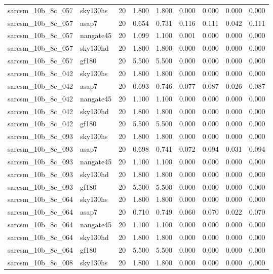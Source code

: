 \begin{tabular}{llrrrrrrr}
sarcsm\_10b\_8c\_057 & sky130hs & 20 & 1.800 & 1.800 & 0.000 & 0.000 & 0.000 & 0.000 \\
sarcsm\_10b\_8c\_057 & asap7 & 20 & 0.654 & 0.731 & 0.116 & 0.111 & 0.042 & 0.111 \\
sarcsm\_10b\_8c\_057 & nangate45 & 20 & 1.099 & 1.100 & 0.001 & 0.000 & 0.000 & 0.000 \\
sarcsm\_10b\_8c\_057 & sky130hd & 20 & 1.800 & 1.800 & 0.000 & 0.000 & 0.000 & 0.000 \\
sarcsm\_10b\_8c\_057 & gf180 & 20 & 5.500 & 5.500 & 0.000 & 0.000 & 0.000 & 0.000 \\
sarcsm\_10b\_8c\_042 & sky130hs & 20 & 1.800 & 1.800 & 0.000 & 0.000 & 0.000 & 0.000 \\
sarcsm\_10b\_8c\_042 & asap7 & 20 & 0.693 & 0.746 & 0.077 & 0.087 & 0.026 & 0.087 \\
sarcsm\_10b\_8c\_042 & nangate45 & 20 & 1.100 & 1.100 & 0.000 & 0.000 & 0.000 & 0.000 \\
sarcsm\_10b\_8c\_042 & sky130hd & 20 & 1.800 & 1.800 & 0.000 & 0.000 & 0.000 & 0.000 \\
sarcsm\_10b\_8c\_042 & gf180 & 20 & 5.500 & 5.500 & 0.000 & 0.000 & 0.000 & 0.000 \\
sarcsm\_10b\_8c\_093 & sky130hs & 20 & 1.800 & 1.800 & 0.000 & 0.000 & 0.000 & 0.000 \\
sarcsm\_10b\_8c\_093 & asap7 & 20 & 0.698 & 0.741 & 0.072 & 0.094 & 0.031 & 0.094 \\
sarcsm\_10b\_8c\_093 & nangate45 & 20 & 1.100 & 1.100 & 0.000 & 0.000 & 0.000 & 0.000 \\
sarcsm\_10b\_8c\_093 & sky130hd & 20 & 1.800 & 1.800 & 0.000 & 0.000 & 0.000 & 0.000 \\
sarcsm\_10b\_8c\_093 & gf180 & 20 & 5.500 & 5.500 & 0.000 & 0.000 & 0.000 & 0.000 \\
sarcsm\_10b\_8c\_064 & sky130hs & 20 & 1.800 & 1.800 & 0.000 & 0.000 & 0.000 & 0.000 \\
sarcsm\_10b\_8c\_064 & asap7 & 20 & 0.710 & 0.749 & 0.060 & 0.070 & 0.022 & 0.070 \\
sarcsm\_10b\_8c\_064 & nangate45 & 20 & 1.100 & 1.100 & 0.000 & 0.000 & 0.000 & 0.000 \\
sarcsm\_10b\_8c\_064 & sky130hd & 20 & 1.800 & 1.800 & 0.000 & 0.000 & 0.000 & 0.000 \\
sarcsm\_10b\_8c\_064 & gf180 & 20 & 5.500 & 5.500 & 0.000 & 0.000 & 0.000 & 0.000 \\
sarcsm\_10b\_8c\_008 & sky130hs & 20 & 1.800 & 1.800 & 0.000 & 0.000 & 0.000 & 0.000 \\

\end{tabular}

